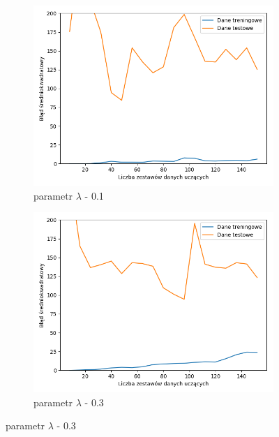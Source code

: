 \documentclass[12pt]{aghdpl}
\begin{document}
		 \begin{figure}[h]
		 	\begin{subfigure}{.5\linewidth}
		 		\includegraphics[width =\linewidth]{wykresy/6_regularyzacja/l2/regularyzacja_0_1_learning_curves.png}
		 		\caption{parametr $\lambda$ - 0.1}
		 	\end{subfigure}
		 	\begin{subfigure}{.5\linewidth}
		 		\includegraphics[width =\linewidth]{wykresy/6_regularyzacja/l2/regularyzacja_0_3_learning_curves.png}
		 		\caption{parametr $\lambda$ - 0.3}
		 	\end{subfigure}
		 	

\end{figure}
\end{document}
